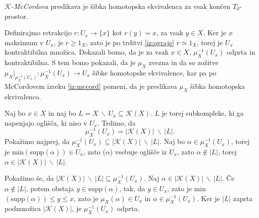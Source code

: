 \documentclass[mat1]{fmfdelo}
\begin{document}
\begin{izrek}
    $\mathcal{K}$-\textit{McCordova} preslikava je šibka homotopska 
    ekvivalenca za vsak končen $T_0$-prostor.
    \label{iz:ksibka}
\end{izrek}

\begin{dokaz}
    Definirajmo retrakcijo $r:U_x\rightarrow \{x\}$ kot 
    $r(y)=x$, za vsak $y\in X$. Ker je $x$ maksimum v 
    $U_x$, je $r\geq 1_X$, zato je po trditvi 
    \ref{iz:ograje} $r\simeq 1_X$, torej je $U_x$ 
    kontraktibilna množica. Dokazali bomo, da je za vsak 
    $x\in X$, $\mu_X^{-1}(U_x)$ odprta in kontraktibilna. S 
    tem bomo pokazali, da je $\mu_X$ zvezna in da so 
    zožitve $\mu_X|_{\mu_X^{-1}(U_x)}:\mu_X^{-1}(U_x)\rightarrow 
    U_x$ šibke homotopske ekvivalence, kar pa po McCordovem izreku \ref{iz:mccord}
    pomeni, da je preslikava $\mu_X$ šibka homotopska ekvivalenca.

    Naj bo $x\in X$ in naj bo $L=X\ \backslash \
    U_x\subseteq \mathcal{K}(X)$. $L$ je torej 
    subkompleks, ki ga napenjajo oglišča, ki niso v $U_x$. 
    Trdimo, da 
    $$
    \mu_X^{-1}(U_x)=|\mathcal{K}(X)|\ \backslash \ |L|.
    $$
    Pokažimo najprej, da $\mu_X^{-1}(U_x)\subseteq 
    |\mathcal{K}(X)|\ \backslash \ |L|$. Naj bo $\alpha \in 
    \mu_X^{-1}(U_x)$, torej je min$(
    (\alpha))\in U_x$, zato \text{supp}($\alpha$) vsebuje 
    oglišče iz $U_x$, zato $\alpha \notin |L|$, torej $\alpha 
    \in |\mathcal{K}(X)|\ \backslash \ |L|$.

    Pokažimo še, da $|\mathcal{K}(X)|\ \backslash \
    |L|\subseteq \mu_X^{-1}(U_x)$. Naj $\alpha \in |\mathcal{K}(X)|\ \backslash \ |L|.$
    Če  $\alpha \notin |L|$, potem obstaja $y\in 
    \text{supp}(\alpha)$, tak, da $y \in U_x$, zato je 
    min$(\text{supp}(\alpha))\leq y \leq x$, zato je 
    $\mu_X(\alpha) \in U_x$ in $\alpha \in \mu_X^{-1}
    (U_x)$.
    Ker je $|L|$ zaprta podmnožica $|\mathcal{K}(X)|$, je 
    $\mu_X^{-1}(U_x)$ odprta.


\end{dokaz}
\end{document}
